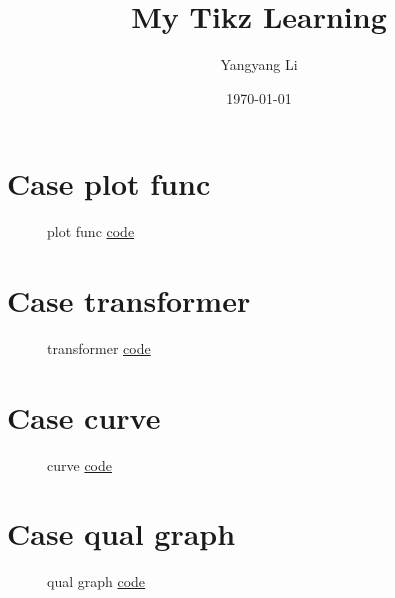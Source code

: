 \documentclass{article}
\title{My Tikz Learning}
\author{Yangyang Li}
\date{\today}
\begin{document}
\maketitle
\clearpage
\tableofcontents


\section{Case plot func}

\begin{figure}[H]
    \centering
    
    \caption{plot func \href{https:/github.com/cauliyang/learn_tikz/blob/main/source/plot_func.tex}{code} }
    \label{fig:plot func}
\end{figure}
    
\section{Case transformer}

\begin{figure}[H]
    \centering
    
    \caption{transformer \href{https:/github.com/cauliyang/learn_tikz/blob/main/source/transformer.tex}{code} }
    \label{fig:transformer}
\end{figure}
    
\section{Case curve}

\begin{figure}[H]
    \centering
    
    \caption{curve \href{https:/github.com/cauliyang/learn_tikz/blob/main/source/curve.tex}{code} }
    \label{fig:curve}
\end{figure}
    
\section{Case qual graph}

\begin{figure}[H]
    \centering
    
    \caption{qual graph \href{https:/github.com/cauliyang/learn_tikz/blob/main/source/qual_graph.tex}{code} }
    \label{fig:qual graph}
\end{figure}
    
\end{document}
